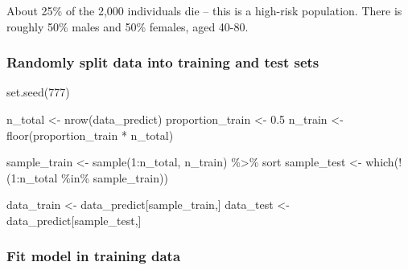 \documentclass[
]{article}
\newenvironment{Shaded}{\begin{snugshade}}{\end{snugshade}}
\newcommand{\DecValTok}[1]{\textcolor[rgb]{0.00,0.00,0.81}{#1}}
\newcommand{\FloatTok}[1]{\textcolor[rgb]{0.00,0.00,0.81}{#1}}
\newcommand{\FunctionTok}[1]{\textcolor[rgb]{0.00,0.00,0.00}{#1}}
\newcommand{\NormalTok}[1]{#1}
\newcommand{\OtherTok}[1]{\textcolor[rgb]{0.56,0.35,0.01}{#1}}
\newcommand{\SpecialCharTok}[1]{\textcolor[rgb]{0.00,0.00,0.00}{#1}}
\begin{document}
About 25\% of the 2,000 individuals die -- this is a high-risk
population. There is roughly 50\% males and 50\% females, aged 40-80.

\hypertarget{randomly-split-data-into-training-and-test-sets}{%
\subsubsection{Randomly split data into training and test
sets}\label{randomly-split-data-into-training-and-test-sets}}

\begin{Shaded}
\begin{Highlighting}[]
\FunctionTok{set.seed}\NormalTok{(}\DecValTok{777}\NormalTok{)}

\NormalTok{n\_total }\OtherTok{\textless{}{-}} \FunctionTok{nrow}\NormalTok{(data\_predict)}
\NormalTok{proportion\_train }\OtherTok{\textless{}{-}} \FloatTok{0.5}
\NormalTok{n\_train }\OtherTok{\textless{}{-}} \FunctionTok{floor}\NormalTok{(proportion\_train }\SpecialCharTok{*}\NormalTok{ n\_total)}

\NormalTok{sample\_train }\OtherTok{\textless{}{-}} \FunctionTok{sample}\NormalTok{(}\DecValTok{1}\SpecialCharTok{:}\NormalTok{n\_total, n\_train) }\SpecialCharTok{\%\textgreater{}\%}\NormalTok{ sort}
\NormalTok{sample\_test }\OtherTok{\textless{}{-}} \FunctionTok{which}\NormalTok{(}\SpecialCharTok{!}\NormalTok{(}\DecValTok{1}\SpecialCharTok{:}\NormalTok{n\_total }\SpecialCharTok{\%in\%}\NormalTok{ sample\_train))}

\NormalTok{data\_train }\OtherTok{\textless{}{-}}\NormalTok{ data\_predict[sample\_train,]}
\NormalTok{data\_test }\OtherTok{\textless{}{-}}\NormalTok{ data\_predict[sample\_test,]}
\end{Highlighting}
\end{Shaded}

\hypertarget{fit-model-in-training-data}{%
\subsubsection{Fit model in training
data}\label{fit-model-in-training-data}}
\end{document}
